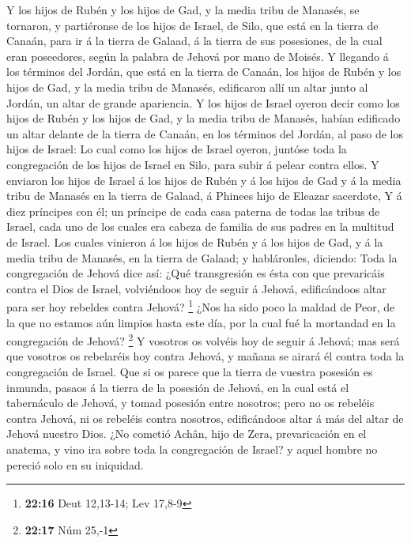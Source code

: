  Y los hijos de Rubén y los hijos de Gad, y la media tribu
de Manasés, se tornaron, y partiéronse de los hijos de Israel, de Silo,
que está en la tierra de Canaán, para ir á la tierra de Galaad, á la
tierra de sus posesiones, de la cual eran poseedores, según la palabra
de Jehová por mano de Moisés.  Y llegando á los términos
del Jordán, que está en la tierra de Canaán, los hijos de Rubén y los
hijos de Gad, y la media tribu de Manasés, edificaron allí un altar
junto al Jordán, un altar de grande apariencia.  Y los
hijos de Israel oyeron decir como los hijos de Rubén y los hijos de Gad,
y la media tribu de Manasés, habían edificado un altar delante de la
tierra de Canaán, en los términos del Jordán, al paso de los hijos de
Israel:  Lo cual como los hijos de Israel oyeron, juntóse
toda la congregación de los hijos de Israel en Silo, para subir á pelear
contra ellos.  Y enviaron los hijos de Israel á los hijos
de Rubén y á los hijos de Gad y á la media tribu de Manasés en la tierra
de Galaad, á Phinees hijo de Eleazar sacerdote,  Y á diez
príncipes con él; un príncipe de cada casa paterna de todas las tribus
de Israel, cada uno de los cuales era cabeza de familia de sus padres en
la multitud de Israel.  Los cuales vinieron á los hijos de
Rubén y á los hijos de Gad, y á la media tribu de Manasés, en la tierra
de Galaad; y habláronles, diciendo:  Toda la congregación
de Jehová dice así: ¿Qué transgresión es ésta con que prevaricáis contra
el Dios de Israel, volviéndoos hoy de seguir á Jehová, edificándoos
altar para ser hoy rebeldes contra Jehová? \footnote{\textbf{22:16} Deut
  12,13-14; Lev 17,8-9}  ¿Nos ha sido poco la maldad de
Peor, de la que no estamos aún limpios hasta este día, por la cual fué
la mortandad en la congregación de Jehová? \footnote{\textbf{22:17} Núm
  25,-1}  Y vosotros os volvéis hoy de seguir á Jehová; mas
será que vosotros os rebelaréis hoy contra Jehová, y mañana se airará él
contra toda la congregación de Israel.  Que si os parece
que la tierra de vuestra posesión es inmunda, pasaos á la tierra de la
posesión de Jehová, en la cual está el tabernáculo de Jehová, y tomad
posesión entre nosotros; pero no os rebeléis contra Jehová, ni os
rebeléis contra nosotros, edificándoos altar á más del altar de Jehová
nuestro Dios.  ¿No cometió Achân, hijo de Zera,
prevaricación en el anatema, y vino ira sobre toda la congregación de
Israel? y aquel hombre no pereció solo en su iniquidad.

